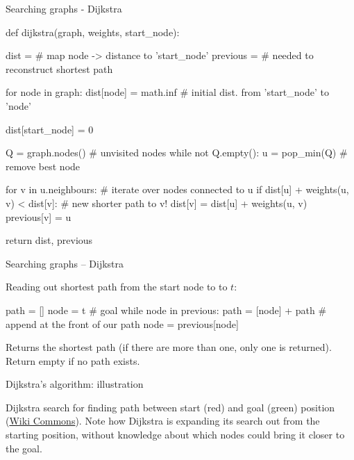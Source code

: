 \documentclass[compress]{beamer}
\begin{document}
\begin{frame}[fragile]{Searching graphs - Dijkstra}

\begin{pythoncode}
def dijkstra(graph, weights, start_node):

  dist = {} # map {node -> distance to 'start_node'}
  previous = {} # needed to reconstruct shortest path

  for node in graph:
    dist[node] = math.inf # initial dist. from 'start_node' to 'node'

  dist[start_node] = 0

  Q = graph.nodes() # unvisited nodes
  while not Q.empty():
    u = pop_min(Q) # remove best node

    for v in u.neighbours: # iterate over nodes connected to u
      if dist[u] + weights(u, v) < dist[v]: # new shorter path to v!
        dist[v] = dist[u] + weights(u, v)
        previous[v] = u

  return dist, previous
\end{pythoncode}
\end{frame}


\begin{frame}[fragile]{Searching graphs -- Dijkstra}

Reading out shortest path from the start node to to $t$:

\begin{pythoncode}
path = []
node = t # goal
while node in previous:
    path = [node] + path # append at the front of our path
    node = previous[node]
\end{pythoncode}

Returns the shortest path (if there are more than one, only one is returned).
Return empty if no path exists.

\end{frame}

\begin{frame}{Dijkstra's algorithm: illustration}

    \begin{center}
    \end{center}

Dijkstra search for finding path between start (red) and goal (green)
position (\href{http://en.wikipedia.org/wiki/Dijkstra's_algorithm}{Wiki
Commons}). Note how Dijkstra is expanding its search out from the
starting position, without knowledge about which nodes could bring it
closer to the goal.

\end{frame}
\end{document}
